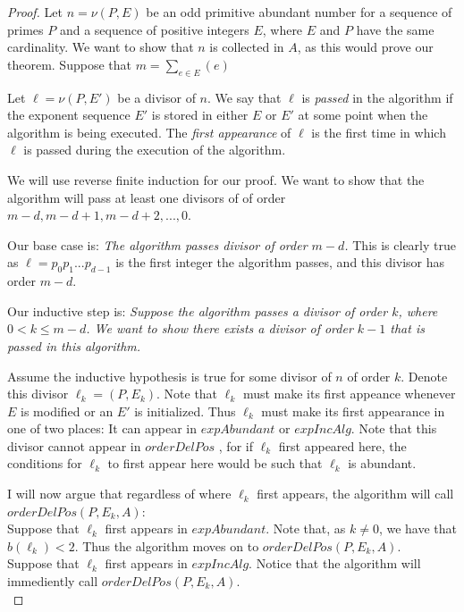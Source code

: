 \documentclass[../paper.tex]{subfiles}
\begin{document}
\begin{proof}
  Let $n = \nu (P, E)$ be an odd primitive abundant number for a
sequence of primes $P$ and a sequence of positive integers $E$,
where $E$ and $P$ have the same cardinality. We want to show that
$n$ is collected in $A$, as this would prove our theorem.
Suppose that $m = \sum_{e \in E}(e)$

  Let $\ell = \nu (P, E')$ be a divisor of $n$. We say that $\ell$ is
\textit{passed} in the algorithm if the exponent sequence $E'$ is
stored in either $E$ or $E'$ at some point when the algorithm is
being executed. The \textit{first appearance} of $\ell$ is the
first time in which $\ell$ is passed during the execution of the
algorithm.

  We will use reverse finite induction for our proof. We want to show that
the algorithm will pass at least one divisors of of order $m -
d, m - d + 1, m - d + 2, ..., 0$.

Our base case is: \textit{The algorithm passes divisor of order $m
- d$.} This is clearly true as $\ell = p_0 p_1 ... p_{d-1}$ is the 
first integer the algorithm passes, and this divisor has order 
$m-d$.

Our inductive step is:
\textit{Suppose the algorithm passes a divisor of order $k$,
where $0 < k \leq m - d $. We want to show there exists a divisor
of order $k - 1$ that is passed in this algorithm.}


Assume the inductive hypothesis is true for some divisor of $n$ of
order $k$. Denote this divisor $\ell_k = (P, E_k)$. Note that
$\ell_k$ must make its first appeance whenever $E$ is modified
or an $E'$ is initialized. Thus $\ell_k$ must make its first
appearance in one of two places: It can appear in $expAbundant$ or
$expIncAlg$. Note that this divisor cannot appear in $orderDelPos$
, for if $\ell_k$ first appeared here, the conditions for $\ell_k$ 
to first appear here would be such that $\ell_k$ is abundant.

  I will now argue that regardless of where $\ell_k$ first
appears, the algorithm will call $orderDelPos(P,E_k,A)$:
\\

Suppose that $\ell_k$ first appears in $expAbundant$. Note that, 
as $k \neq 0$, we have that $b(\ell_k) < 2$. Thus the algorithm 
moves on to $orderDelPos(P, E_k, A)$.
\\

Suppose that $\ell_k$ first appears in $expIncAlg$. Notice that
the algorithm will immediently call $orderDelPos(P, E_k, A)$.
\\


\end{proof}
\end{document}
